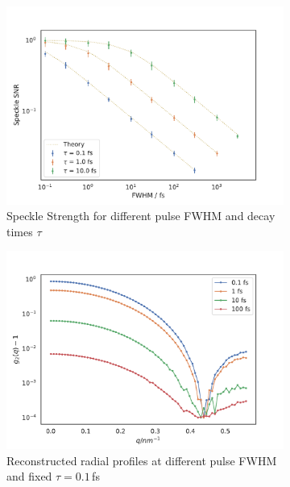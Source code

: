 \begin{figure}
\centering
	
	\begin{subfigure}[b]{0.45\textwidth}
		\includegraphics[width=\linewidth]{images/timedependent_1.pdf}
		\caption{Speckle Strength for different pulse FWHM and decay times $\tau$}
		\label{fig:pulsedecay}
	\end{subfigure}
	\hspace{0.1cm}
	\begin{subfigure}[b]{0.45\textwidth}
		\centering
		\includegraphics[width=\linewidth]{images/tdsphere.pdf}
		\caption{Reconstructed radial profiles at different pulse FWHM and fixed $\tau = 0.1$\,fs}
		\label{fig:tdpshere}
	\end{subfigure}
	\begin{subfigure}[b]{0.45\textwidth}

\end{subfigure}
\end{figure}
